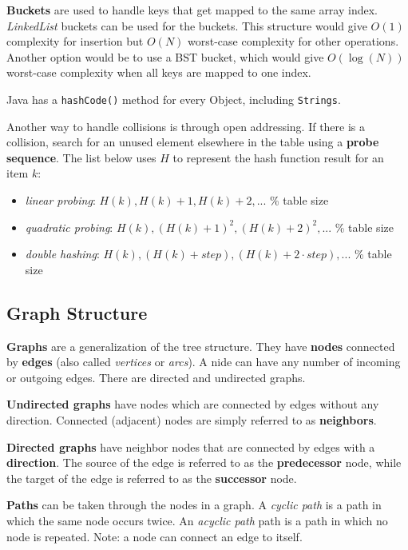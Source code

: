 \textbf{Buckets} are used to handle keys that get mapped to the same array index. \textit{LinkedList} buckets can be used for the buckets. This structure would give $O(1)$ complexity for insertion but $O(N)$ worst-case complexity for other operations. Another option would be to use a BST bucket, which would give $O(\log(N))$ worst-case complexity when all keys are mapped to one index.

Java has a \texttt{hashCode()} method for every Object, including \texttt{Strings}. 

Another way to handle collisions is through open addressing. If there is a collision, search for an unused element elsewhere in the table using a \textbf{probe sequence}. The list below uses $H$ to represent the hash function result for an item $k$:

\begin{itemize}
	\item \textit{linear probing}: $H(k), H(k)+1, H(k)+2, ...$ \% table size
	\item \textit{quadratic probing}: $H(k), (H(k)+1)^{2}, (H(k)+2)^{2}, ...$ \% table size
	\item \textit{double hashing}: $H(k), (H(k)+step), (H(k)+2\cdot step), ...$ \% table size
\end{itemize}

\subsection{Graph Structure}

\textbf{Graphs} are a generalization of the tree structure. They have \textbf{nodes} connected by \textbf{edges} (also called \textit{vertices} or \textit{arcs}). A nide can have any number of incoming or outgoing edges. There are directed and undirected graphs.

\textbf{Undirected graphs} have nodes which are connected by edges without any direction. Connected (adjacent) nodes are simply referred to as \textbf{neighbors}. 

\textbf{Directed graphs} have neighbor nodes that are connected by edges with a \textbf{direction}. The source of the edge is referred to as the \textbf{predecessor} node, while the target of the edge is referred to as the \textbf{successor} node. 

\textbf{Paths} can be taken through the nodes in a graph. A \textit{cyclic path} is a path in which the same node occurs twice. An \textit{acyclic path} path is a path in which no node is repeated. Note: a node can connect an edge to itself. 

